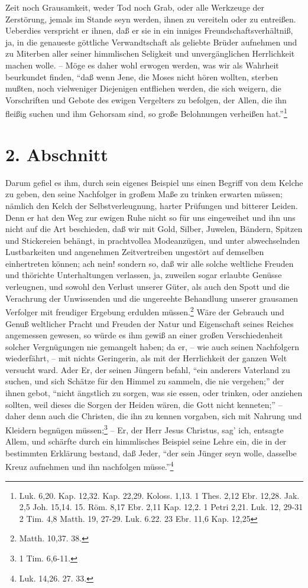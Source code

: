 Zeit noch Grausamkeit, weder Tod noch Grab, oder alle Werkzeuge der Zerstörung,
jemals im Stande seyn werden, ihnen zu vereiteln oder zu entreißen. Ueberdies
verspricht er ihnen, daß er sie in ein inniges Freundschaftsverhältniß, ja, in
die genaueste göttliche Verwandtschaft als geliebte Brüder aufnehmen und zu
Miterben aller seiner himmlischen Seligkeit und unvergänglichen Herrlichkeit
machen wolle. -- Möge es daher wohl erwogen werden, was wir als Wahrheit
beurkundet finden, "`daß wenn Jene, die Moses nicht hören wollten, sterben
mußten, noch vielweniger Diejenigen entfliehen werden, die sich weigern, die
Vorschriften und Gebote des ewigen Vergelters zu befolgen, der Allen, die ihn
fleißig suchen und ihm Gehorsam sind, so große Belohnungen verheißen
hat."'\footnote{Luk. 6,20. Kap. 12,32. Kap. 22,29. Koloss. 1,13. 1 Thes. 2,12
Ebr. 12,28. Jak. 2,5 Joh. 15,14. 15. Röm. 8,17 Ebr. 2,11  Kap. 12,2. 1 Petri
2,21. Luk. 12, 29-31 2 Tim. 4,8 Matth. 19, 27-29. Luk. 6.22. 23 Ebr. 11,6 Kap.
12,25}

\section{2. Abschnitt}

Darum gefiel es ihm, durch sein eigenes Beispiel uns einen Begriff von dem
Kelche zu geben, den seine Nachfolger in großem Maße zu trinken erwarten müssen;
nämlich den Kelch der Selbstverleugnung, harter Prüfungen und bitterer Leiden.
Denn er hat den Weg zur ewigen Ruhe nicht so für uns eingeweihet und ihn uns
nicht auf die Art beschieden, daß wir mit Gold, Silber, Juwelen, Bändern,
Spitzen und Stickereien behängt, in prachtvollea Modeanzügen, und unter
abwechselnden Lustbarkeiten und angenehmen Zeitvertreiben ungestört auf
demselben einhertreten können; ach nein! sondern so, daß wir alle solche
weltliche Freuden und thörichte Unterhaltungen verlassen, ja, zuweilen sogar
erlaubte Genüsse verleugnen, und sowohl den Verlust unserer Güter, als auch den
Spott und die Verachrung der Unwissenden und die ungereehte Behandlung unserer
grausamen Verfolger mit freudiger Ergebung erdulden müssen.\footnote{Matth.
10,37. 38. } Wäre der Gebrauch und Genuß weltlicher Pracht und Freuden der Natur
und Eigenschaft seines Reiches angemessen gewesen, so würde es ihm gewiß an
einer großen Verschiedenheit solcher Vergnügungen nie gemangelt haben; da er, --
wie auch seinen Nachfolgern wiederfährt, -- mit nichts Geringerin, als mit der
Herrlichkeit der ganzen Welt versucht ward. Ader Er, der seinen Jüngern befahl,
"`ein anderers Vaterland zu suchen, und sich Schätze für den Himmel zu sammeln,
die nie vergehen;"' der ihnen gebot, "`nicht ängstlich zu sorgen, was sie essen,
oder trinken, oder anziehen sollten, weil dieses die Sorgen der Heiden wären,
die Gott nicht kenneten;"' – daher denn auch die Christen, die ihn zu kennen
vorgaben, sich mit Nahrung und Kleidern begnügen müssen;\footnote{1 Tim.
6,6-11.} -- Er, der Herr Jesus Christus, sag’ ich, entsagte Allem, und schärfte
durch ein himmlisches Beispiel seine Lehre ein, die in der bestimmten Erklärung
bestand, daß Jeder, "`der sein Jünger seyn wolle, dasselbe Kreuz aufnehmen und
ihn nachfolgen müsse."'\footnote{Luk. 14,26. 27. 33.}

